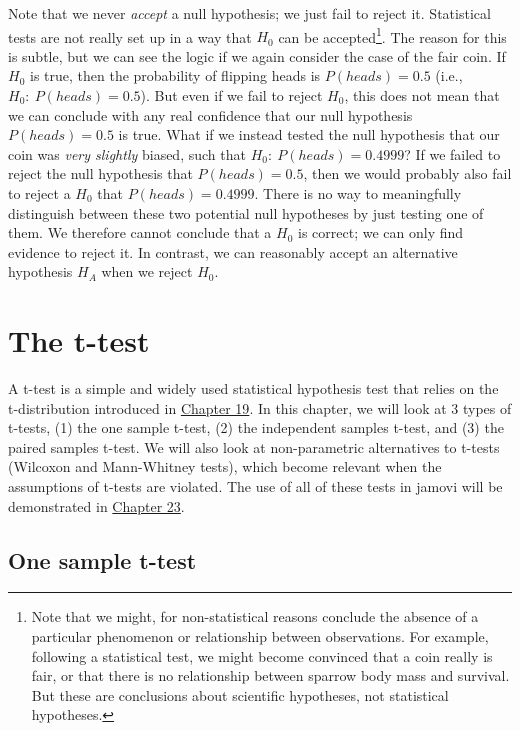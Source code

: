 \documentclass[
]{scrbook}
\begin{document}
Note that we never \emph{accept} a null hypothesis; we just fail to reject it.
Statistical tests are not really set up in a way that \(H_{0}\) can be accepted\footnote{Note that we might, for non-statistical reasons conclude the absence of a particular phenomenon or relationship between observations. For example, following a statistical test, we might become convinced that a coin really is fair, or that there is no relationship between sparrow body mass and survival. But these are conclusions about scientific hypotheses, not statistical hypotheses.}.
The reason for this is subtle, but we can see the logic if we again consider the case of the fair coin.
If \(H_{0}\) is true, then the probability of flipping heads is \(P(heads) = 0.5\) (i.e., \(H_{0}:\:P(heads) = 0.5\)).
But even if we fail to reject \(H_{0}\), this does not mean that we can conclude with any real confidence that our null hypothesis \(P(heads) = 0.5\) is true.
What if we instead tested the null hypothesis that our coin was \emph{very slightly} biased, such that \(H_{0}:\:P(heads) = 0.4999\)?
If we failed to reject the null hypothesis that \(P(heads) = 0.5\), then we would probably also fail to reject a \(H_{0}\) that \(P(heads) = 0.4999\).
There is no way to meaningfully distinguish between these two potential null hypotheses by just testing one of them.
We therefore cannot conclude that a \(H_{0}\) is correct; we can only find evidence to reject it.
In contrast, we can reasonably accept an alternative hypothesis \(H_{A}\) when we reject \(H_{0}\).

\hypertarget{Chapter_22}{%
\chapter{The t-test}\label{Chapter_22}}

A t-test is a simple and widely used statistical hypothesis test that relies on the t-distribution introduced in \protect\hyperlink{Chapter_19}{Chapter 19}.
In this chapter, we will look at 3 types of t-tests, (1) the one sample t-test, (2) the independent samples t-test, and (3) the paired samples t-test.
We will also look at non-parametric alternatives to t-tests (Wilcoxon and Mann-Whitney tests), which become relevant when the assumptions of t-tests are violated.
The use of all of these tests in jamovi will be demonstrated in \protect\hyperlink{Chapter_23}{Chapter 23}.

\hypertarget{one-sample-t-test}{%
\section{One sample t-test}\label{one-sample-t-test}}
\end{document}

